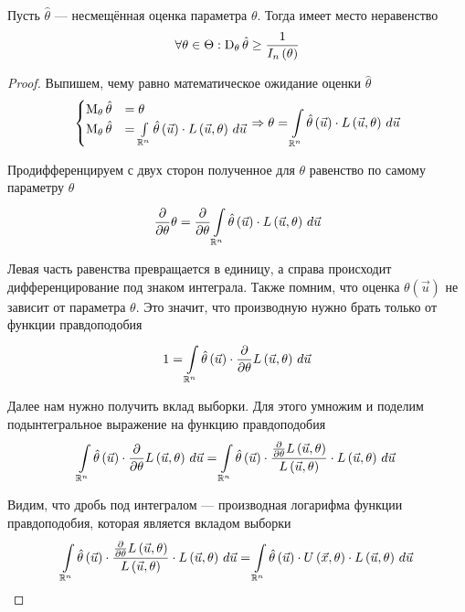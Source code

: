 \begin{theorem}
  \label{theorem:Rao-Kramer}
  Пусть $\hat{\theta}$ --- несмещённая оценка параметра $\theta$.
  Тогда имеет место неравенство
  $$\forall\theta\in\Theta:
    \dispersionof{\theta}{\hat{\theta}}
    \ge\frac{1}{I_n\left(\theta\right)}$$
\end{theorem}
\begin{proof}
  Выпишем, чему равно математическое ожидание оценки $\hat{\theta}$
  $$\begin{cases}
    \meanof{\theta}{\hat{\theta}}
      &=\theta\\
    \meanof{\theta}{\hat{\theta}}
      &=\integral{\mathbb{R}^n}{}{\vec{u}}{
        \hat{\theta}\left( \vec{u} \right)
          \cdot L\left( \vec{u},\theta \right)}
    \end{cases}
    \Rightarrow
    \theta=\integral{\mathbb{R}^n}{}{\vec{u}}{
        \hat{\theta}\left( \vec{u} \right)
          \cdot L\left( \vec{u},\theta \right)}$$

  Продифференцируем с двух сторон полученное для $\theta$ равенство
  по самому параметру $\theta$
  $$\frac{\partial}{\partial \theta}\theta
    = \frac{\partial}{\partial \theta}\integral{\mathbb{R}^n}{}{\vec{u}}{
        \hat{\theta}\left( \vec{u} \right)
          \cdot L\left( \vec{u},\theta \right)}$$

  Левая часть равенства превращается в единицу,
  а справа происходит дифференцирование под знаком интеграла.
  Также помним, что оценка $\theta\left( \vec{u} \right)$
  не зависит от параметра $\theta$.
  Это значит, что производную нужно брать только от функции правдоподобия
  $$1 = \integral{\mathbb{R}^n}{}{\vec{u}}{\hat{\theta}\left( \vec{u} \right)
    \cdot \frac{\partial}{\partial \theta}L\left( \vec{u},\theta \right)}$$

  Далее нам нужно получить вклад выборки.
  Для этого умножим и поделим подынтегральное выражение
  на функцию правдоподобия
  $$\integral{\mathbb{R}^n}{}{\vec{u}}{\hat{\theta}\left( \vec{u} \right)
    \cdot \frac{\partial}{\partial \theta}L\left( \vec{u},\theta \right)}
  = \integral{\mathbb{R}^n}{}{\vec{u}}{\hat{\theta}\left( \vec{u} \right)
    \cdot \frac{
      \frac{\partial}{\partial \theta}L\left( \vec{u},\theta \right)}
      {L\left( \vec{u},\theta \right)}
        \cdot L\left( \vec{u},\theta \right)}$$

  Видим, что дробь под интегралом --- производная логарифма
  функции правдоподобия, которая является вкладом выборки
  $$\integral{\mathbb{R}^n}{}{\vec{u}}{\hat{\theta}\left( \vec{u} \right)
    \cdot \frac{
      \frac{\partial}{\partial \theta}L\left( \vec{u},\theta \right)}
      {L\left( \vec{u},\theta \right)}
        \cdot L\left( \vec{u},\theta \right)}
    = \integral{\mathbb{R}^n}{}{\vec{u}}{\hat{\theta}\left( \vec{u} \right)
      \cdot
        U\left( \vec{x},\theta \right)
          \cdot L\left( \vec{u},\theta \right)}$$


\end{proof}
